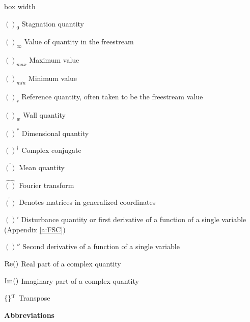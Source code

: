 \begin{descriptionlist}{box width}

\item[$()_0$]           Stagnation quantity

\item[$()_\infty$]      Value of quantity in the freestream

\item[$()_{max}$]	Maximum value

\item[$()_{min}$]	Minimum value

\item[$()_r$]		Reference quantity, often taken to be the 
                        freestream value

\item[$()_w$]		Wall quantity

\item[$()^*$]           Dimensional quantity

\item[$()^\dagger$]     Complex conjugate

\item[$\overline{()}$]  Mean quantity

\item[$\widehat{()}$]   Fourier transform

\item[$\check{()}$]     Denotes matrices in generalized coordinates

\item[$()'$]            Disturbance quantity or first derivative 
                        of a function of a single variable \break
                        (Appendix \ref{a:FSC})

\item[$()''$]           Second derivative of a function of a single variable

\item[${\rm Re}()$]     Real part of a complex quantity

\item[${\rm Im}()$]     Imaginary part of a complex quantity

\item[$\{\}^{\rm T}$]	Transpose

\end{descriptionlist}

\bigskip
\centerline{\Large\bf Abbreviations}

